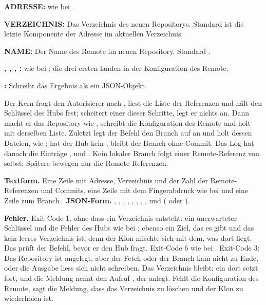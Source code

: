 \startitemize
\item {\bf ADRESSE:} wie bei .
\item {\bf VERZEICHNIS:} Das Verzeichnis des neuen Repositorys. Standard ist die letzte
Komponente der Adresse im aktuellen Verzeichnis.
\item {\bf {} NAME:} Der Name des Remote im neuen Repository, Standard
.
\item {\bf {}, , , :} wie bei
; die drei ersten landen in der Konfiguration des Remote.
\item {\bf {}:} Schreibt das Ergebnis als ein JSON-Objekt.
\stopitemize

Der Kern fragt den Autorisierer nach , liest die Liste der Referenzen und hält den
Schlüssel des Hubs fest; scheitert einer dieser Schritte, legt er nichts an. Dann macht er das
Repository wie , schreibt die Konfiguration des Remote und holt mit derselben Liste.
Zuletzt legt der Befehl den Branch  auf  an und holt
dessen Dateien, wie ; hat der Hub kein , bleibt der Branch ohne
Commit. Das Log hat danach die Einträge ,  und .
Kein lokaler Branch folgt einer Remote-Referenz von selbst: Spätere  bewegen nur
die Remote-Referenzen.

{\bf Textform.} Eine Zeile mit Adresse, Verzeichnis und der Zahl der Remote-Referenzen und
Commits, eine Zeile mit dem Fingerabdruck wie bei  und eine Zeile zum Branch
. {\bf JSON-Form.} , , , ,
, , , ,  und
 ( oder ).

{\bf Fehler.} Exit-Code 1, ohne dass ein Verzeichnis entsteht: ein unerwarteter Schlüssel und
die Fehler des Hubs wie bei ; ebenso ein Ziel, das es gibt und das kein leeres
Verzeichnis ist, denn der Klon mischte sich mit dem, was dort liegt. Das prüft der Befehl, bevor er
den Hub fragt. Exit-Code 6 wie bei . Exit-Code 3: Das Repository ist
angelegt, aber der Fetch oder der Branch  kam nicht zu Ende, oder die Ausgabe liess
sich nicht schreiben. Das Verzeichnis bleibt;
ein  dort setzt fort, und die Meldung nennt den Aufruf , der
 anlegt. Fehlt die Konfiguration des Remote, sagt die Meldung, dass das Verzeichnis
zu löschen und der Klon zu wiederholen ist.

